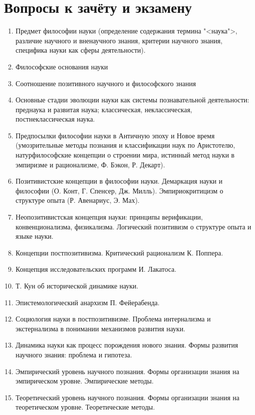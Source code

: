 \documentclass[main.tex]{subfiles}
\begin{document}
\section{Вопросы к зачёту и экзамену}

\begin{enumerate}
	\item Предмет философии науки (определение содержания термина "<наука">, различие научного и вненаучного знания, критерии научного знания, специфика науки как сферы деятельности).
	\item Философские основания науки
	\item Соотношение позитивного научного и философского знания
	\item Основные стадии эволюции науки как системы познавательной деятельности: преднаука и развитая наука; классическая, неклассическая, постнеклассическая наука.
	\item Предпосылки философии науки в Античную эпоху и Новое время (умозрительные методы познания и классификации наук по Аристотелю, натурфилософские концепции о строении мира, истинный метод науки в эмпиризме и рационализме, Ф. Бэкон, Р. Декарт).
	\item Позитивистские концепции в философии науки. Демаркация науки и философии (О. Конт, Г. Спенсер, Дж. Милль). Эмпириокритицизм о структуре опыта (Р. Авенариус, Э. Мах).
	\item Неопозитивистская концепция науки: принципы верификации, конвенционализма, физикализма. Логический позитивизм о структуре опыта и языке науки.
	\item Концепции постпозитивизма. Критический рационализм К. Поппера.
	\item Концепция исследовательских программ И. Лакатоса.
	\item Т. Кун об исторической динамике науки.
	\item Эпистемологический анархизм П. Фейерабенда.
	\item Социология науки в постпозитивизме. Проблема интернализма и экстернализма в понимании механизмов развития науки.
	\item Динамика науки как процесс порождения нового знания. Формы развития научного знания: проблема и гипотеза.
	\item Эмпирический уровень научного познания. Формы организации знания на эмпирическом уровне. Эмпирические методы.
	\item Теоретический уровень научного познания. Формы организации знания на теоретическом уровне. Теоретические методы.

\end{enumerate}
\end{document}
